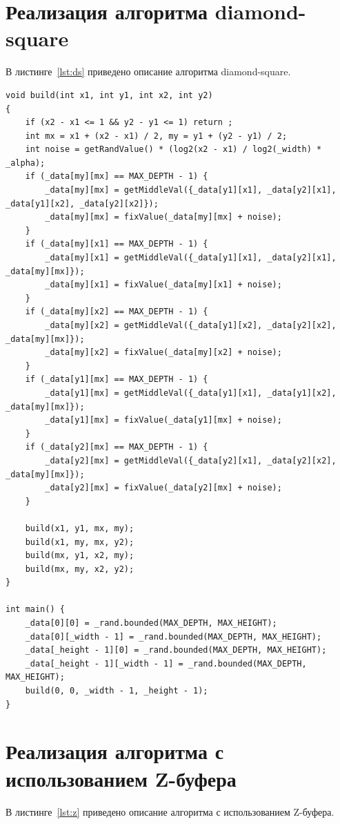 \documentclass[a4paper, 14pt]{extreport}
\begin{document}
\section{Реализация алгоритма diamond-square}

В листинге~\ref{lst:ds} приведено описание алгоритма diamond-square.
\begin{lstlisting}[style=lang, label=lst:ds,caption=Реализация алгоритма diamond-square]
void build(int x1, int y1, int x2, int y2)
{
    if (x2 - x1 <= 1 && y2 - y1 <= 1) return ;
    int mx = x1 + (x2 - x1) / 2, my = y1 + (y2 - y1) / 2;
    int noise = getRandValue() * (log2(x2 - x1) / log2(_width) * _alpha);
    if (_data[my][mx] == MAX_DEPTH - 1) {
        _data[my][mx] = getMiddleVal({_data[y1][x1], _data[y2][x1], _data[y1][x2], _data[y2][x2]});
        _data[my][mx] = fixValue(_data[my][mx] + noise);
    }
    if (_data[my][x1] == MAX_DEPTH - 1) {
        _data[my][x1] = getMiddleVal({_data[y1][x1], _data[y2][x1], _data[my][mx]});
        _data[my][x1] = fixValue(_data[my][x1] + noise);
    }
    if (_data[my][x2] == MAX_DEPTH - 1) {
        _data[my][x2] = getMiddleVal({_data[y1][x2], _data[y2][x2], _data[my][mx]});
        _data[my][x2] = fixValue(_data[my][x2] + noise);
    }
    if (_data[y1][mx] == MAX_DEPTH - 1) {
        _data[y1][mx] = getMiddleVal({_data[y1][x1], _data[y1][x2], _data[my][mx]});
        _data[y1][mx] = fixValue(_data[y1][mx] + noise);
    }
    if (_data[y2][mx] == MAX_DEPTH - 1) {
        _data[y2][mx] = getMiddleVal({_data[y2][x1], _data[y2][x2], _data[my][mx]});
        _data[y2][mx] = fixValue(_data[y2][mx] + noise);
    }

    build(x1, y1, mx, my);
    build(x1, my, mx, y2);
    build(mx, y1, x2, my);
    build(mx, my, x2, y2);
}

int main() {
    _data[0][0] = _rand.bounded(MAX_DEPTH, MAX_HEIGHT);
    _data[0][_width - 1] = _rand.bounded(MAX_DEPTH, MAX_HEIGHT);
    _data[_height - 1][0] = _rand.bounded(MAX_DEPTH, MAX_HEIGHT);
    _data[_height - 1][_width - 1] = _rand.bounded(MAX_DEPTH, MAX_HEIGHT);
    build(0, 0, _width - 1, _height - 1);
}
\end{lstlisting}

\section{Реализация алгоритма с использованием Z-буфера}

В листинге~\ref{lst:z} приведено описание алгоритма с использованием Z-буфера.
\end{document}
